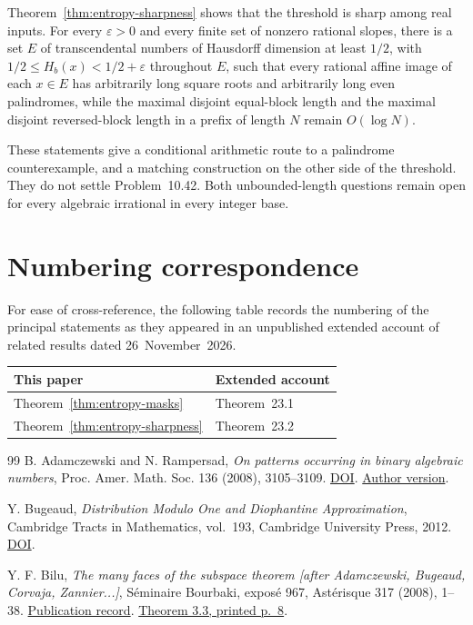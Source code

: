 \documentclass[11pt,reqno,a4paper]{amsart}
\theoremstyle{remark}
\begin{document}
Theorem~\ref{thm:entropy-sharpness} shows that the threshold is sharp among real inputs. For every $\varepsilon>0$ and every finite set of nonzero rational slopes, there is a set $E$ of transcendental numbers of Hausdorff dimension at least $1/2$, with $1/2\le H_b(x)<1/2+\varepsilon$ throughout $E$, such that every rational affine image of each $x\in E$ has arbitrarily long square roots and arbitrarily long even palindromes, while the maximal disjoint equal-block length and the maximal disjoint reversed-block length in a prefix of length $N$ remain $O(\log N)$.

These statements give a conditional arithmetic route to a palindrome counterexample, and a matching construction on the other side of the threshold. They do not settle Problem~10.42. Both unbounded-length questions remain open for every algebraic irrational in every integer base.



\section*{Numbering correspondence}
For ease of cross-reference, the following table records the numbering of the principal statements as they appeared in an unpublished extended account of related results dated 26~November~2026.
\begin{center}
\begin{tabular}{@{}ll@{}}
\toprule
This paper & Extended account \\
\midrule
Theorem~\ref{thm:entropy-masks} & Theorem~23.1 \\
Theorem~\ref{thm:entropy-sharpness} & Theorem~23.2 \\
\bottomrule
\end{tabular}
\end{center}

\begin{thebibliography}{99}
B. Adamczewski and N. Rampersad,
\emph{On patterns occurring in binary algebraic numbers},
Proc. Amer. Math. Soc. 136 (2008), 3105--3109.
\href{https://doi.org/10.1090/S0002-9939-08-09319-2}{DOI}.
\href{https://adamczewski.perso.math.cnrs.fr/Overlap.pdf}{Author version}.

Y. Bugeaud,
\emph{Distribution Modulo One and Diophantine Approximation},
Cambridge Tracts in Mathematics, vol.~193, Cambridge University Press,
2012.
\href{https://doi.org/10.1017/CBO9781139017732}{DOI}.

Y. F. Bilu, \emph{The many faces of the subspace theorem [after
Adamczewski, Bugeaud, Corvaja, Zannier...]}, S\'eminaire Bourbaki,
expos\'e 967, Ast\'erisque 317 (2008), 1--38.
\href{https://www.numdam.org/book-part/AST_2008__317__1_0/}{Publication record}.
\href{https://arxiv.org/pdf/0907.2098#page=8}{Theorem 3.3, printed p.~8}.


\end{thebibliography}
\end{document}
